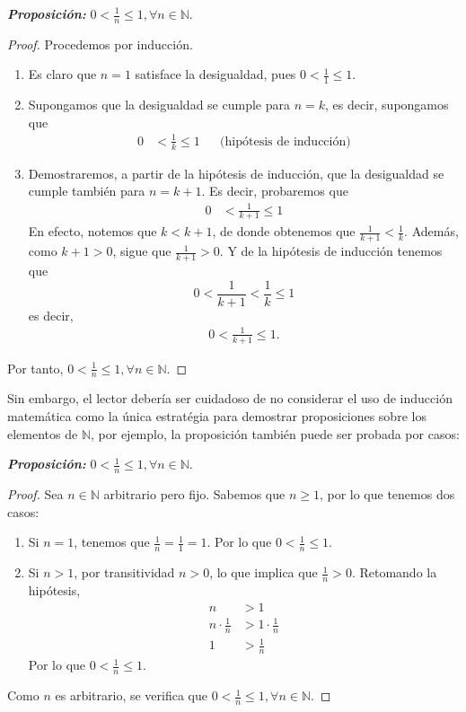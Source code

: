 \documentclass[11pt]{article}
\newcommand{\N}{\mathbb{N}}
\newcommand{\bfit}[1]{\textbf{\textit{#1}}}
\begin{document}
\bfit{Proposición:} $0<\frac{1}{n}\leq 1, \forall n\in \N$.
\begin{proof}
  Procedemos por inducción. \begin{enumerate}[label=\roman*)]
    \item Es claro que $n=1$ satisface la desigualdad, pues $0<\frac{1}{1} \leq 1$.
    \item Supongamos que la desigualdad se cumple para $n=k$, es decir, supongamos que \begin{align*}
      0&<\frac{1}{k}\leq 1 && \text{(hipótesis de inducción)}
    \end{align*}
    \item Demostraremos, a partir de la hipótesis de inducción, que la desigualdad se cumple también para $n=k+1$. Es decir, probaremos que \begin{align*}
      0&<\frac{1}{k+1}\leq 1
    \end{align*}
    En efecto, notemos que $k<k+1$, de donde obtenemos que $\frac{1}{k+1} < \frac{1}{k}$. Además, como $k+1>0$, sigue que $\frac{1}{k+1}>0$. Y de la hipótesis de inducción tenemos que \[0 < \frac{1}{k+1} < \frac{1}{k} \leq 1\]
    es decir, \begin{align*}
      0<\frac{1}{k+1}\leq 1.
    \end{align*}
  \end{enumerate}
  Por tanto, $0<\frac{1}{n}\leq 1, \forall n\in \N$.
\end{proof}

Sin embargo, el lector debería ser cuidadoso de no considerar el uso de inducción matemática como la única estratégia para demostrar proposiciones sobre los elementos de $\N$, por ejemplo, la proposición también puede ser probada por casos:

\bfit{Proposición:} $0<\frac{1}{n}\leq 1, \forall n\in \N$.
 \begin{proof}
  Sea $n\in \N$ arbitrario pero fijo. Sabemos que $n\geq 1$, por lo que tenemos dos casos: \begin{enumerate}[label=\roman*)]
   \item Si $n=1$, tenemos que $\frac{1}{n}=\frac{1}{1}=1$. Por lo que $0<\frac{1}{n}\leq 1$.
   \item Si $n>1$, por transitividad $n>0$, lo que implica que $\frac{1}{n}>0$. Retomando la hipótesis, \begin{align*}
    n &> 1\\
    n \cdot \frac{1}{n} &> 1\cdot \frac{1}{n}\\
    1 &> \frac{1}{n}
   \end{align*} Por lo que $0<\frac{1}{n}\leq 1$. 
  \end{enumerate} Como $n$ es arbitrario, se verifica que $0<\frac{1}{n}\leq 1, \forall n\in \N$.
 \end{proof}
\end{document}
